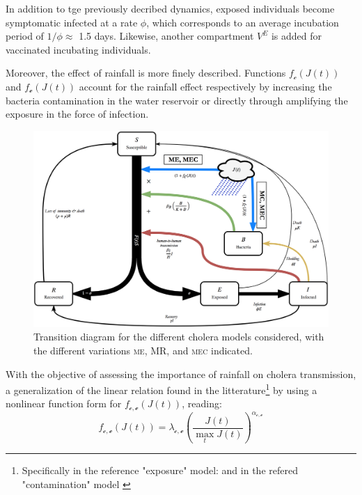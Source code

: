 In addition to tge previously decribed dynamics, exposed individuals become symptomatic infected at a rate $\phi$, which corresponds to an average incubation period of $1/\phi\approx$ 1.5 days\cite{Azman:IncubationPeriodCholera:2013}. Likewise, another compartment $V^E$ is added for vaccinated incubating individuals.


Moreover, the effect of rainfall is more finely described. Functions $f_{\mathcal{c}}\left(J(t)\right)$ and $f_{\mathcal{e}}\left(J(t)\right)$ account for the rainfall effect respectively by increasing the bacteria contamination in the water reservoir or directly through amplifying the exposure in the force of infection.
\begin{figure}
  \centering
  \includegraphics{fig_cholera-rainfall/Lemaitre_ACTROP_2018_42_R1_fig1.png}
  \caption[Transition diagram for the competing cholera models]{Transition diagram for the different cholera models considered, with the different variations \textsc{me}, \textsc{MR}, and \textsc{mec} indicated.}
  \label{diagram}
\end{figure}
With the objective of assessing the importance of rainfall on cholera transmission, a generalization of the linear relation found in the litterature\footnote{Specifically in the reference "exposure" model: \parencite{Eisenberg:ExaminingRainfallCholera:2013} and in the refered "contamination" model \parencite{Rinaldo:Reassessment20102011:2012}} by using a nonlinear function form for  $f_{\mathcal{c,e}}\left(J(t)\right)$, reading:
\begin{equation}
    f_{\mathcal{c,e}}\left(J(t)\right)=\lambda_{\mathcal{c,e}} \left(\frac{J(t)}{\max_t J(t)}\right)^{\alpha_{\mathcal{c,e}}}
    \label{eq:nonlinear_rain}
\end{equation}
